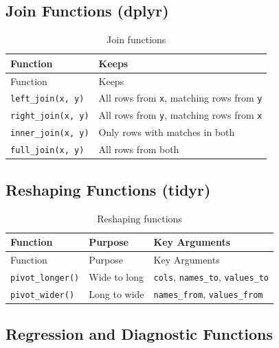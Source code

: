 \documentclass[
  letterpaper,
  DIV=11,
  numbers=noendperiod]{scrreprt}
\begin{document}
\subsection{Join Functions (dplyr)}\label{join-functions-dplyr-1}

\begin{longtable}[]{@{}ll@{}}
\caption{Join functions}\label{tbl-join-ref}\tabularnewline
\toprule\noalign{}
Function & Keeps \\
\midrule\noalign{}
\endfirsthead
\toprule\noalign{}
Function & Keeps \\
\midrule\noalign{}
\endhead
\bottomrule\noalign{}
\endlastfoot
\texttt{left\_join(x,\ y)} & All rows from \texttt{x}, matching rows
from \texttt{y} \\
\texttt{right\_join(x,\ y)} & All rows from \texttt{y}, matching rows
from \texttt{x} \\
\texttt{inner\_join(x,\ y)} & Only rows with matches in both \\
\texttt{full\_join(x,\ y)} & All rows from both \\
\end{longtable}

\subsection{Reshaping Functions
(tidyr)}\label{reshaping-functions-tidyr-1}

\begin{longtable}[]{@{}lll@{}}
\caption{Reshaping functions}\label{tbl-reshape-ref}\tabularnewline
\toprule\noalign{}
Function & Purpose & Key Arguments \\
\midrule\noalign{}
\endfirsthead
\toprule\noalign{}
Function & Purpose & Key Arguments \\
\midrule\noalign{}
\endhead
\bottomrule\noalign{}
\endlastfoot
\texttt{pivot\_longer()} & Wide to long & \texttt{cols},
\texttt{names\_to}, \texttt{values\_to} \\
\texttt{pivot\_wider()} & Long to wide & \texttt{names\_from},
\texttt{values\_from} \\
\end{longtable}

\subsection{Regression and Diagnostic
Functions}\label{regression-and-diagnostic-functions}
\end{document}

